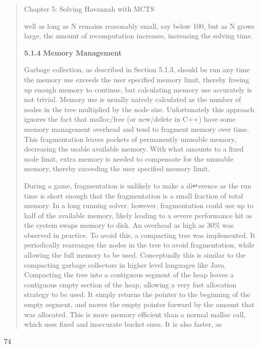 \documentclass[
]{article}
\begin{document}
\begin{quote}
Chapter 5: Solving Havannah with MCTS

well as long as N remains reasonably small, say below 100, but as N
grows large, the amount of recomputation increases, increasing the
solving time.

\textbf{5.1.4} \textbf{Memory Management}

Garbage collection, as described in Section 5.1.3, should be run any
time the memory use exceeds the user specified memory limit, thereby
freeing up enough memory to continue, but calculating memory use
accurately is not trivial. Memory use is usually naively calculated as
the number of nodes in the tree multiplied by the node size.
Unfortunately this approach ignores the fact that malloc/free (or
new/delete in C++) have some memory management overhead and tend to
fragment memory over time. This fragmentation leaves pockets of
permanently unusable memory, decreasing the usable available memory.
With what amounts to a fixed node limit, extra memory is needed to
compensate for the unusable memory, thereby exceeding the user specified
memory limit.

During a game, fragmentation is unlikely to make a di↵erence as the run
time is short enough that the fragmentation is a small fraction of total
memory. In a long running solver, however, fragmentation could use up to
half of the available memory, likely leading to a severe performance hit
as the system swaps memory to disk. An overhead as high as 30\% was
observed in practice. To avoid this, a compacting tree was implemented.
It periodically rearranges the nodes in the tree to avoid fragmentation,
while allowing the full memory to be used. Conceptually this is similar
to the compacting garbage collectors in higher level languages like
Java. Compacting the tree into a contiguous segment of the heap leaves a
contiguous empty section of the heap, allowing a very fast allocation
strategy to be used. It simply returns the pointer to the beginning of
the empty segment, and moves the empty pointer forward by the amount
that was allocated. This is more memory efficient than a normal malloc
call, which uses fixed and inaccurate bucket sizes. It is also faster,
as
\end{quote}

74
\end{document}
